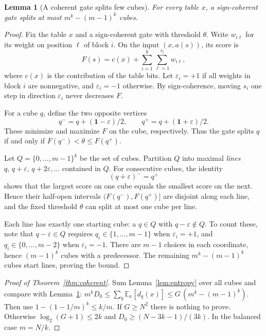 \documentclass[11pt,letterpaper]{article}
\newtheorem{lemma}[theorem]{Lemma}
\theoremstyle{remark}
\begin{document}
\begin{lemma}[A coherent gate splits few cubes]\label{lem:diag}
For every table $x$, a sign-coherent gate splits at most $m^k-(m-1)^k$ cubes.
\end{lemma}
\begin{proof}
Fix the table $x$ and a sign-coherent gate with threshold $\theta$.
Write $w_{i\ell}$ for its weight on position $\ell$ of block $i$.
On the input $(x,a(s))$, its score is
\[
F(s)=c(x)+\sum_{i=1}^k\sum_{\ell=1}^{s_i}w_{i\ell},
\]
where $c(x)$ is the contribution of the table bits. Let $\varepsilon_i=+1$
if all weights in block $i$ are nonnegative, and $\varepsilon_i=-1$
otherwise. By sign-coherence, moving $s_i$ one step in direction
$\varepsilon_i$ never decreases $F$.

For a cube $q$, define the two opposite vertices
\[
q^-=q+(\mathbf1-\varepsilon)/2,
\qquad q^+=q+(\mathbf1+\varepsilon)/2.
\]
These minimize and maximize $F$ on the cube, respectively. Thus the gate
splits $q$ if and only if $F(q^-)<\theta\le F(q^+)$.

Let $Q=\{0,\dots,m-1\}^k$ be the set of cubes. Partition $Q$ into maximal
\emph{lines} $q,\,q+\varepsilon,\,q+2\varepsilon,\dots$ contained in $Q$.
For consecutive cubes, the identity
\[
(q+\varepsilon)^-=q^+
\]
shows that the largest score on one cube equals the smallest score on the
next. Hence their half-open intervals $(F(q^-),F(q^+)]$ are disjoint
along each line, and the fixed threshold $\theta$ can split at most one
cube per line.

Each line has exactly one starting cube: a $q\in Q$ with
$q-\varepsilon\notin Q$. To count these, note that $q-\varepsilon\in Q$
requires $q_i\in\{1,\dots,m-1\}$ when $\varepsilon_i=+1$, and
$q_i\in\{0,\dots,m-2\}$ when $\varepsilon_i=-1$. There are $m-1$ choices
in each coordinate, hence $(m-1)^k$ cubes with a predecessor.
The remaining $m^k-(m-1)^k$ cubes start lines, proving the bound.
\end{proof}

\begin{proof}[Proof of Theorem~\ref{thm:coherent}]
Sum Lemma~\ref{lem:entropy} over all cubes and compare with
Lemma~\ref{lem:diag}:
$m^kD_0\le\sum_q\mathbb E_x[d_q(x)]\le G\,(m^k-(m-1)^k)$.
Then use $1-(1-1/m)^k\le k/m$. If $G\ge N^2$ there is nothing to prove. Otherwise $\log_2(G+1)\le2k$ and
$D_0\ge(N-3k-1)/(3k)$. In the balanced case $m=N/k$.
\end{proof}
\end{document}
